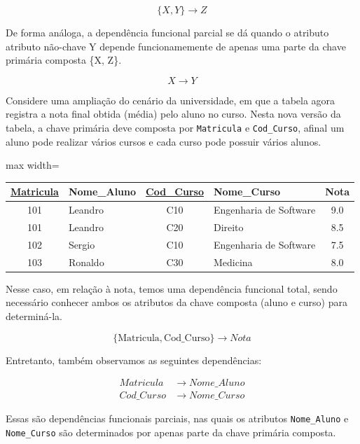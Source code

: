     \[
    \{X, Y\} \rightarrow Z
    \]

De forma análoga, a dependência funcional parcial se dá quando o atributo atributo não-chave Y depende funcionamemente de apenas uma parte da chave primária composta \{X, Z\}.

    \[
    X \rightarrow Y
    \]


\begin{tcolorbox}[breakable,colback=blue!5,colframe=blue!40!black,title=Situação exemplo]
    Considere uma ampliação do cenário da universidade, em que a tabela agora registra a nota final obtida (média) pelo aluno no curso. Nesta nova versão da tabela, a chave primária deve composta por \texttt{Matricula} e \texttt{Cod\_Curso}, afinal um aluno pode realizar vários cursos e cada curso pode possuir vários alunos.

    \vspace{0.4cm}  
    \renewcommand{\arraystretch}{1.2}

    \begin{adjustbox}{max width=\textwidth}
    \begin{tabular}{|c|l|c|l|c|}
    \hline
    \textbf{\underline{Matricula}} & \textbf{Nome\_Aluno} & \textbf{\underline{Cod\_Curso}} & \textbf{Nome\_Curso} & \textbf{Nota} \\ \hline
    101 & Leandro & C10 & Engenharia de Software & 9.0 \\ \hline
    101 & Leandro & C20 & Direito & 8.5 \\ \hline
    102 & Sergio & C10 & Engenharia de Software & 7.5 \\ \hline
    103 & Ronaldo & C30 & Medicina & 8.0 \\ \hline
    \end{tabular}
\end{adjustbox}
    \vspace{0.4cm}

    Nesse caso, em relação à nota, temos uma dependência funcional total, sendo necessário conhecer ambos os atributos da chave composta (aluno e curso) para determiná-la.

    \[
    \{\text{Matricula}, \text{Cod\_Curso}\} \rightarrow Nota
    \]

    \vspace{0.3cm}

    Entretanto, também observamos as seguintes dependências:

    \[
    \begin{aligned}
    Matricula &\rightarrow Nome\_Aluno \\
    Cod\_Curso &\rightarrow Nome\_Curso
    \end{aligned}
    \]

    Essas são dependências funcionais parciais, nas quais os atributos \texttt{Nome\_Aluno} e \texttt{Nome\_Curso} são determinados por apenas parte da chave primária composta.
\end{tcolorbox}

